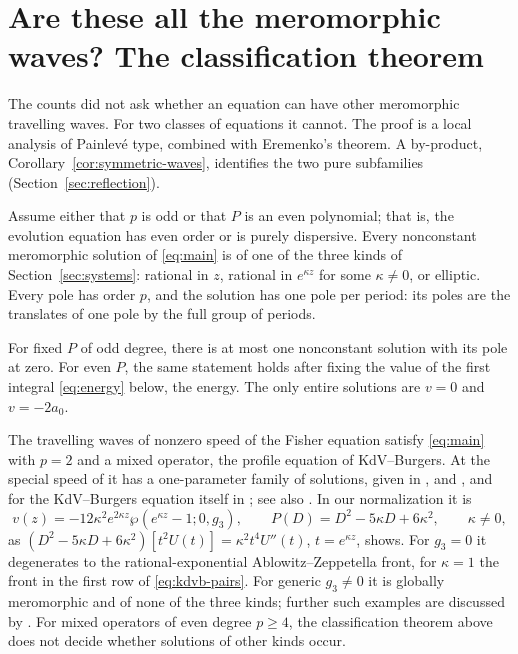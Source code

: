 \section{Are these all the meromorphic waves? The classification theorem}
\label{sec:completeness}

The counts did not ask whether an equation can have other meromorphic
travelling waves. For two classes of equations it cannot. The proof is a
local analysis of Painlev\'e type, combined with Eremenko's theorem. A
by-product, Corollary~\ref{cor:symmetric-waves}, identifies the two pure
subfamilies (Section~\ref{sec:reflection}).

\begin{theorem}[Classification]\label{thm:complete}
Assume either that \(p\) is odd or that \(P\) is an even polynomial;
that is, the evolution equation has even order or is purely dispersive.
Every nonconstant meromorphic solution of \eqref{eq:main} is of one of
the three kinds of Section~\ref{sec:systems}: rational in \(z\),
rational in \(e^{\kappa z}\) for some \(\kappa\ne0\), or elliptic. Every
pole has order \(p\), and the solution has one pole per period: its
poles are the translates of one pole by the full group of periods.

For fixed \(P\) of odd degree, there is at most one nonconstant solution
with its pole at zero. For even \(P\), the same statement holds after
fixing the value of the first integral \eqref{eq:energy} below, the
energy. The only entire solutions are \(v=0\) and \(v=-2a_0\).
\end{theorem}

\begin{remark}
\label{rem:fisher}
The travelling waves of nonzero speed of the Fisher equation satisfy
\eqref{eq:main} with \(p=2\) and a mixed operator, the profile equation
of KdV--Burgers. At the special speed of \citet{AblowitzZeppetella1979}
it has a one-parameter family of solutions, given in
\citet{Kudryashov2010}, \citet[Lemma~4.4]{ConteNgWu2015} and
\citet{McCueElHachemSimpson2021}, and for the KdV--Burgers equation
itself in \citet{Kudryashov2009KdVB}; see also
\citet{KudryashovFisher2005}. In our normalization it is
\[
 v(z)=-12\kappa^2e^{2\kappa z}\wp(e^{\kappa z}-1;0,g_3),\qquad
 P(D)=D^2-5\kappa D+6\kappa^2,\qquad\kappa\ne0,
\]
as \((D^2-5\kappa D+6\kappa^2)[t^2U(t)]=\kappa^2t^4U''(t)\),
\(t=e^{\kappa z}\), shows. For \(g_3=0\) it degenerates to the
rational-exponential Ablowitz--Zeppetella front, for \(\kappa=1\) the
front in the first row of \eqref{eq:kdvb-pairs}. For generic \(g_3\ne0\)
it is globally meromorphic and of none of the three kinds; further such
examples are discussed by \citet[Remark~1.11]{NgWu2019}. For mixed
operators of even degree \(p\ge4\), the classification theorem above
does not decide whether solutions of other kinds occur.
\end{remark}


